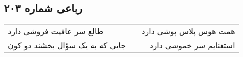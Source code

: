\begin{center}
\section*{رباعی شماره ۲۰۳}
\label{sec:sh203}
\begin{longtable}{l p{0.5cm} r}
طالع سر عافیت فروشی دارد
&&
همت هوس پلاس پوشی دارد
\\
جایی که به یک سؤال بخشند دو کون
&&
استغنایم سر خموشی دارد
\\
\end{longtable}
\end{center}
